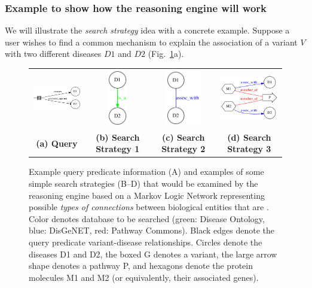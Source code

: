 \documentclass[11pt,notitlepage]{article}
\begin{document}
\subsubsection{Example to show how the reasoning engine will work}
We will illustrate the {\em search strategy\/} idea with a concrete
example. Suppose a user wishes to find a common mechanism to explain the
association of a variant $V$ with two different diseases $D1$ and $D2$
(Fig.~\ref{fig:networks}a).
\begin{figure}[h!]
  \begin{tabular}{cccc}
    \includegraphics[width=1.4in]{baseproblem.png} &
    \includegraphics[width=0.35in]{net1.png} &
    \includegraphics[width=0.6in]{net2.png} &
    \includegraphics[width=1.5in]{net3.png}\\
    {\bf (a) Query} & {\bf (b) Search Strategy 1} & {\bf (c) Search Strategy 2} & {\bf (d) Search Strategy 3}
  \end{tabular}
  \caption{Example query predicate information (A) and examples of some simple
    search strategies (B--D) that would be examined by the reasoning engine based on
    a Markov Logic Network representing possible {\em types of connections\/}  between biological
    entities that are
   . Color denotes database to be searched (green: Disease Ontology,
    blue: DisGeNET, red: Pathway Commons). Black edges denote the query
    predicate variant-disease relationships. Circles denote the diseases D1 and
    D2, the boxed G denotes a variant, the large arrow shape denotes a pathway
    P, and hexagons denote the protein molecules M1 and M2 (or equivalently,
    their associated genes).}
  \label{fig:networks}
\end{figure}
\end{document}
